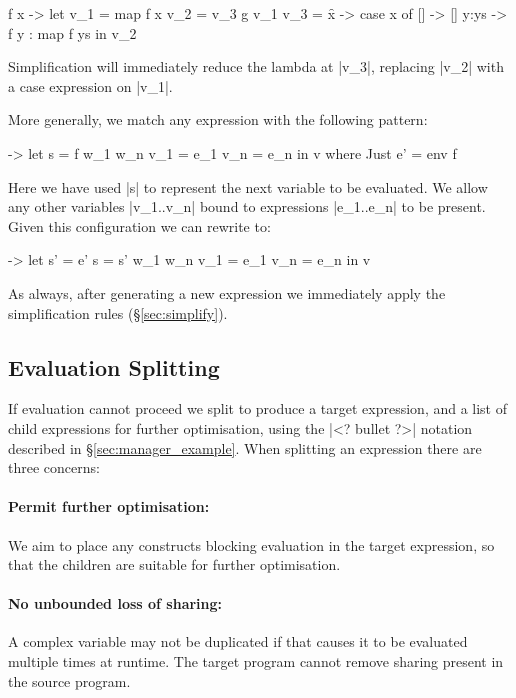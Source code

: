 \documentclass[draft]{sigplanconf}
\begin{document}
\begin{code}
\g f x ->  let  v_1 =  map f x
                v_2 =  v_3 g v_1
                v_3 =  \f x -> case  x of
                                     []    -> []
                                     y:ys  -> f y : map f ys
           in   v_2
\end{code}

Simplification will immediately reduce the lambda at |v_3|, replacing |v_2| with a case expression on |v_1|.

More generally, we match any expression with the following pattern:

\begin{code}
\free ->  let  s    = f w_1 w_n
               v_1  = e_1
               v_n  = e_n
          in   v
where Just e' = env f
\end{code}

Here we have used |s| to represent the next variable to be evaluated. We allow any other variables |v_1..v_n| bound to expressions |e_1..e_n| to be present. Given this configuration we can rewrite to:

\begin{code}
\free ->  let  s'   = e'
               s    = s' w_1 w_n
               v_1  = e_1
               v_n  = e_n
          in   v
\end{code}

As always, after generating a new expression we immediately apply the simplification rules (\S\ref{sec:simplify}).

\subsection{Evaluation Splitting}
\label{sec:eval_split}

If evaluation cannot proceed we split to produce a target expression, and a list of child expressions for further optimisation, using the |<? bullet ?>| notation described in \S\ref{sec:manager_example}. When splitting an expression there are three concerns:

\paragraph{Permit further optimisation:} We aim to place any constructs blocking evaluation in the target expression, so that the children are suitable for further optimisation.

\paragraph{No unbounded loss of sharing:} A complex variable may not be duplicated if that causes it to be evaluated multiple times at runtime. The target program cannot remove sharing present in the source program.
\end{document}
